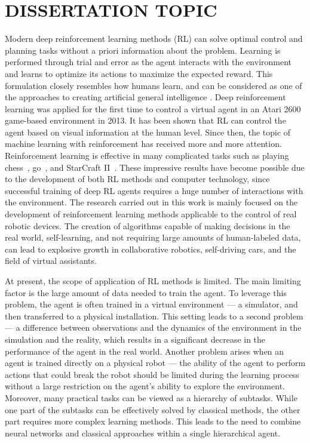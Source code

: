 \section*{\centering DISSERTATION TOPIC}

\renewcommand{\figurename}{Figure}
\renewcommand{\tablename}{Table}
\renewcommand{\bibtitlefull}{References}

Modern deep reinforcement learning methods (RL) can solve optimal control and planning tasks without a priori information about the problem. Learning is performed through trial and error as the agent interacts with the environment and learns to optimize its actions to maximize the expected reward. This formulation closely resembles how humans learn, and can be considered as one of the approaches to creating artificial general intelligence \cite{reward_is_enough}. Deep reinforcement learning was applied for the first time to control a virtual agent in an Atari 2600 game-based environment in 2013\cite{mnih2013atari}. It has been shown that RL can control the agent based on visual information at the human level. Since then, the topic of machine learning with reinforcement has received more and more attention. Reinforcement learning is effective in many complicated tasks such as playing chess~\cite{alphazero}, go~\cite{alphago}, and StarCraft II~\cite{alphastar}. These impressive results have become possible due to the development of both RL methods and computer technology, since successful training of deep RL agents requires a huge number of interactions with the environment. The research carried out in this work is mainly focused on the development of reinforcement learning methods applicable to the control of real robotic devices. The creation of algorithms capable of making decisions in the real world, self-learning, and not requiring large amounts of human-labeled data, can lead to explosive growth in collaborative robotics, self-driving cars, and the field of virtual assistants.

At present, the scope of application of RL methods is limited. The main limiting factor is the large amount of data needed to train the agent. To leverage this problem, the agent is often trained in a virtual environment --- a simulator, and then transferred to a physical installation. This setting leads to a second problem --- a difference between observations and the dynamics of the environment in the simulation and the reality, which results in a significant decrease in the performance of the agent in the real world. Another problem arises when an agent is trained directly on a physical robot --- the ability of the agent to perform actions that could break the robot should be limited during the learning process without a large restriction on the agent's ability to explore the environment. Moreover, many practical tasks can be viewed as a hierarchy of subtasks. While one part of the subtasks can be effectively solved by classical methods, the other part requires more complex learning methods. This leads to the need to combine neural networks and classical approaches within a single hierarchical agent.

